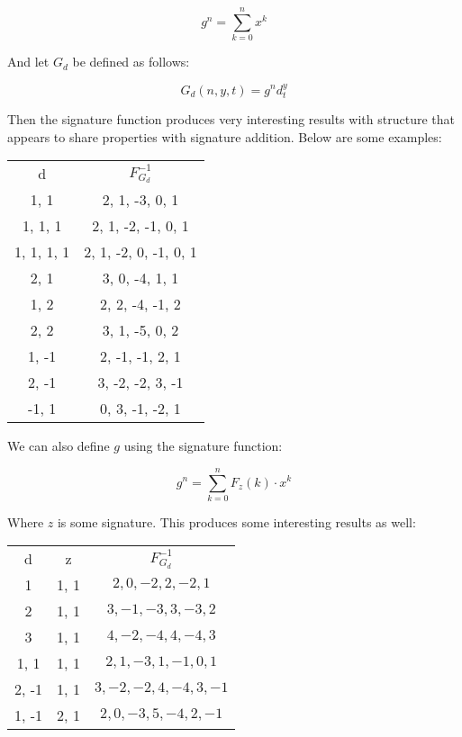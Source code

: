 \documentclass{article}
\begin{document}
$$g^n = \sum_{k=0}^{n} x^k$$

\noindent And let $G_d$ be defined as follows:

$$G_d (n, y, t) = g^n d_t^y$$

\noindent Then the signature function produces very interesting results with structure that appears to share properties with signature addition. Below are some examples:

\begin{center}
\begin{tabular}{c c}
d & $F_{G_d}^{-1}$\\
1, 1 &  2, 1, -3, 0, 1\\
1, 1, 1 & 2, 1, -2, -1, 0, 1\\
1, 1, 1, 1 & 2, 1, -2, 0, -1, 0, 1\\
2, 1 & 3, 0, -4, 1, 1\\
1, 2 & 2, 2, -4, -1, 2\\
2, 2 & 3, 1, -5, 0, 2\\
1, -1 & 2, -1, -1, 2, 1\\
2, -1 & 3, -2, -2, 3, -1\\
-1, 1 & 0, 3, -1, -2, 1\\
\end{tabular}
\end{center}

\noindent We can also define $g$ using the signature function:

$$g^n = \sum_{k=0}^{n} F_z(k) \cdot x^k$$

\noindent Where $z$ is some signature. This produces some interesting results as well:

\begin{center}
\begin{tabular}{c c c}
d &\hspace{2mm} z & \hspace{4mm} $F^{-1}_{G_d}$\\
1 & 1, 1 & ${2, 0, -2, 2, -2, 1}$\\
2 & 1, 1 & ${3, -1, -3, 3, -3, 2}$\\
3 & 1, 1 & $4, -2, -4, 4, -4, 3$\\
1, 1 & 1, 1 & ${2, 1, -3, 1, -1, 0, 1}$\\
2, -1 & 1, 1 & ${3, -2, -2, 4, -4, 3, -1}$\\
1, -1 & 2, 1 & ${2, 0, -3, 5, -4, 2, -1}$\\
\end{tabular}
\end{center}
\end{document}
